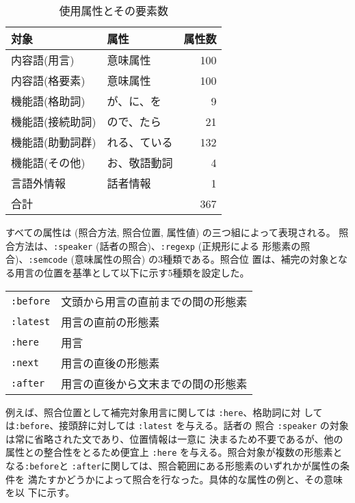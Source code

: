 \begin{table}
\begin{center}
\caption{使用属性とその要素数}
\label{属性}
\begin{tabular}{llr}
\hline\hline
対象               & 属性       & 属性数 \\
\hline
内容語(用言)   & 意味属性   & 100 \\
内容語(格要素) & 意味属性   & 100 \\
\hline
機能語(格助詞)   & が、に、を    &   9 \\
機能語(接続助詞) & ので、たら    &  21 \\
機能語(助動詞群) & れる、ている  & 132 \\
機能語(その他)   & お、敬語動詞  &   4 \\
\hline
言語外情報     & 話者情報     &   1 \\
\hline
合計               &              & 367 \\
\hline
\end{tabular}
\end{center}
\end{table}

すべての属性は (照合方法, 照合位置, 属性値) の三つ組によって表現される。
照合方法は、\verb+:speaker+ (話者の照合)、\verb+:regexp+ (正規形による
形態素の照合)、\verb+:semcode+ (意味属性の照合) の3種類である。照合位
置は、補完の対象となる用言の位置を基準として以下に示す5種類を設定した。
\smallskip

\begin{tabular}{ll}
\verb+:before+ & 文頭から用言の直前までの間の形態素 \\
\verb+:latest+ &  用言の直前の形態素 \\
\verb+:here+ &  用言 \\
\verb+:next+ &  用言の直後の形態素 \\
\verb+:after+ &  用言の直後から文末までの間の形態素 \\
\end{tabular}\medskip

\noindent
例えば、照合位置として補完対象用言に関しては \verb+:here+、格助詞に対
しては\verb+:before+、接頭辞に対しては \verb+:latest+ を与える。話者の
照合 \verb+:speaker+ の対象は常に省略された文であり、位置情報は一意に
決まるため不要であるが、他の属性との整合性をとるため便宜上 
\verb+:here+ を与える。照合対象が複数の形態素となる\verb+:before+と
\verb+:after+に関しては、照合範囲にある形態素のいずれかが属性の条件を
満たすかどうかによって照合を行なった。具体的な属性の例と、その意味を以
下に示す。\smallskip

